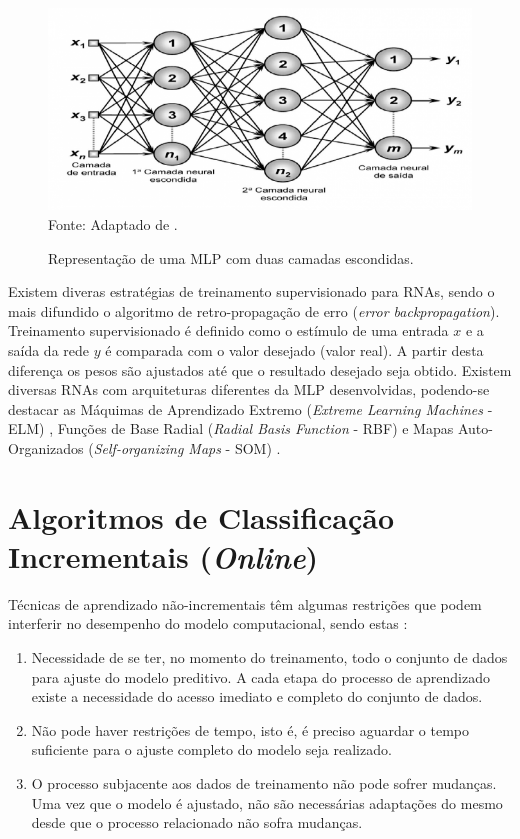 \begin{figure}[!htb]
	\centering
	\caption{Representação de uma MLP com duas camadas escondidas.}
	\includegraphics[width=0.8\linewidth]{MLP.png}\\
	{\small Fonte: Adaptado de .}
	\label{fig:mlp}
\end{figure}

Existem diveras estratégias de treinamento supervisionado para RNAs, sendo o mais difundido o algoritmo de retro-propagação de erro (\textit{error backpropagation}). Treinamento supervisionado é definido como o estímulo de uma entrada $x$ e a saída da rede $y$ é comparada com o valor desejado (valor real). A partir desta diferença os pesos são ajustados até que o resultado desejado seja obtido. Existem diversas RNAs com arquiteturas diferentes da MLP desenvolvidas, podendo-se destacar as Máquimas de Aprendizado Extremo (\textit{Extreme Learning Machines} - ELM) \cite{huang2006extreme}, Funções de Base Radial (\textit{Radial Basis Function} - RBF) \cite{powell1987algorithms} e Mapas Auto-Organizados (\textit{Self-organizing Maps} - SOM) \cite{VanHulle2012}.

\section{Algoritmos de Classificação Incrementais (\textit{Online})}

Técnicas de aprendizado não-incrementais têm algumas restrições que podem interferir no desempenho do modelo computacional, sendo estas \cite{fontenla2013online}:
\begin{enumerate}
	\item Necessidade de se ter, no momento do treinamento, todo o conjunto de dados para ajuste do modelo preditivo. A cada etapa do processo de aprendizado existe a necessidade do acesso imediato e completo do conjunto de dados.
	
	\item Não pode haver restrições de tempo, isto é, é preciso aguardar o tempo suficiente para o ajuste completo do modelo seja realizado.
	
	\item O processo subjacente aos dados de treinamento não pode sofrer mudanças. Uma vez que o modelo é ajustado, não são necessárias adaptações do mesmo desde que o processo relacionado não sofra mudanças.
\end{enumerate}

